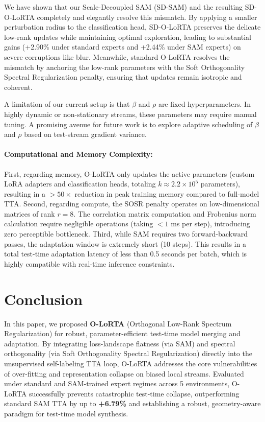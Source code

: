 \documentclass{article}
\theoremstyle{plain}
\theoremstyle{definition}
\theoremstyle{remark}
\begin{document}
We have shown that our Scale-Decoupled SAM (SD-SAM) and the resulting SD-O-LoRTA completely and elegantly resolve this mismatch. By applying a smaller perturbation radius to the classification head, SD-O-LoRTA preserves the delicate low-rank updates while maintaining optimal exploration, leading to substantial gains (+2.90\% under standard experts and +2.44\% under SAM experts) on severe corruptions like blur. Meanwhile, standard O-LoRTA resolves the mismatch by anchoring the low-rank parameters with the Soft Orthogonality Spectral Regularization penalty, ensuring that updates remain isotropic and coherent.

A limitation of our current setup is that $\beta$ and $\rho$ are fixed hyperparameters. In highly dynamic or non-stationary streams, these parameters may require manual tuning. A promising avenue for future work is to explore adaptive scheduling of $\beta$ and $\rho$ based on test-stream gradient variance.

\paragraph{Computational and Memory Complexity:}
First, regarding memory, O-LoRTA only updates the active parameters (custom LoRA adapters and classification heads, totaling $k \approx 2.2 \times 10^5$ parameters), resulting in a $>50\times$ reduction in peak training memory compared to full-model TTA. Second, regarding compute, the SOSR penalty operates on low-dimensional matrices of rank $r=8$. The correlation matrix computation and Frobenius norm calculation require negligible operations (taking $<1$ ms per step), introducing zero perceptible bottleneck. Third, while SAM requires two forward-backward passes, the adaptation window is extremely short (10 steps). This results in a total test-time adaptation latency of less than 0.5 seconds per batch, which is highly compatible with real-time inference constraints.

\section{Conclusion}
\label{submission-conclusion}
In this paper, we proposed \textbf{O-LoRTA} (Orthogonal Low-Rank Spectrum Regularization) for robust, parameter-efficient test-time model merging and adaptation. By integrating loss-landscape flatness (via SAM) and spectral orthogonality (via Soft Orthogonality Spectral Regularization) directly into the unsupervised self-labeling TTA loop, O-LoRTA addresses the core vulnerabilities of over-fitting and representation collapse on biased local streams. Evaluated under standard and SAM-trained expert regimes across 5 environments, O-LoRTA successfully prevents catastrophic test-time collapse, outperforming standard SAM TTA by up to \textbf{+6.79\%} and establishing a robust, geometry-aware paradigm for test-time model synthesis.
\end{document}
